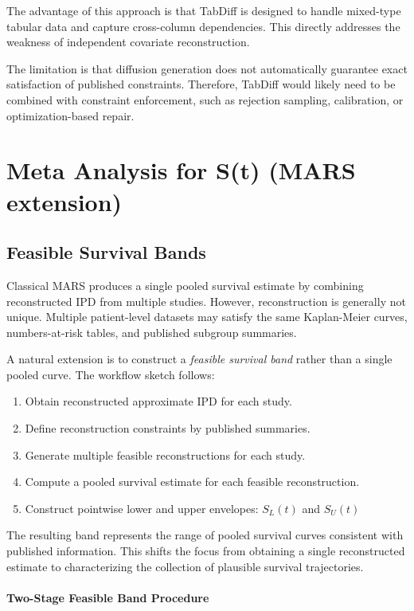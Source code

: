 \documentclass[11pt]{article}
\begin{document}
The advantage of this approach is that TabDiff is designed to handle mixed-type tabular data and capture cross-column dependencies. This directly addresses the weakness of independent covariate reconstruction.

The limitation is that diffusion generation does not automatically guarantee exact satisfaction of published constraints. Therefore, TabDiff would likely need to be combined with constraint enforcement, such as rejection sampling, calibration, or optimization-based repair.

\section{Meta Analysis for S(t) (MARS extension)}

\subsection{Feasible Survival Bands}

Classical MARS produces a single pooled survival estimate by combining reconstructed IPD from multiple studies. However, reconstruction is generally not unique. Multiple patient-level datasets may satisfy the same Kaplan-Meier curves, numbers-at-risk tables, and published subgroup summaries.

A natural extension is to construct a \emph{feasible survival band} rather than a single pooled curve. The workflow sketch follows:

\begin{enumerate}
\item Obtain reconstructed approximate IPD for each study.
\item Define reconstruction constraints by published summaries.
\item Generate multiple feasible reconstructions for each study.
\item Compute a pooled survival estimate for each feasible reconstruction.
\item Construct pointwise lower and upper envelopes: $S_{L}(t)$ and $S_{U}(t)$
\end{enumerate}

The resulting band represents the range of pooled survival curves consistent with published information. This shifts the focus from obtaining a single reconstructed estimate to characterizing the collection of plausible survival trajectories.

\paragraph{Two-Stage Feasible Band Procedure}
\end{document}
